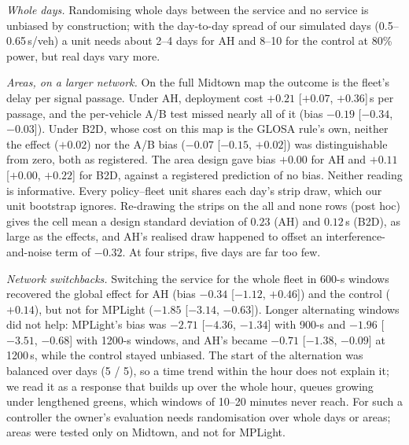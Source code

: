 \emph{Whole days.} Randomising whole days between the service and no service is unbiased by construction; with the day-to-day spread of our
simulated days (0.5--0.65\,s/veh) a unit needs about 2--4 days for AH and 8--10 for the control at 80\% power, but real days vary more.

\emph{Areas, on a larger network.} On the full Midtown map the outcome is the fleet's delay per signal passage. Under AH, deployment cost
$+0.21$ [$+0.07$, $+0.36$]\,s per passage, and the per-vehicle A/B test missed nearly all of it (bias $-0.19$ [$-0.34$, $-0.03$]).
Under B2D, whose cost on this map is the GLOSA rule's own, neither the effect ($+0.02$) nor the A/B bias ($-0.07$ [$-0.15$, $+0.02$]) was
distinguishable from zero, both as registered. The area design gave bias $+0.00$ for AH and $+0.11$ [$+0.00$, $+0.22$] for B2D, against
a registered prediction of no bias. Neither reading is informative. Every policy--fleet unit shares each day's strip draw, which our unit
bootstrap ignores. Re-drawing the strips on the all and none rows (post hoc) gives the cell mean a design standard deviation of $0.23$
(AH) and $0.12$\,s (B2D), as large as the effects, and AH's realised draw happened to offset an interference-and-noise term of $-0.32$.
At four strips, five days are far too few.

\emph{Network switchbacks.} Switching the service for the whole fleet in 600-s windows recovered the global effect for AH (bias $-0.34$
[$-1.12$, $+0.46$]) and the control ($+0.14$), but not for MPLight ($-1.85$ [$-3.14$, $-0.63$]). Longer alternating windows did not help: MPLight's bias was $-2.71$
[$-4.36$, $-1.34$] with 900-s and $-1.96$ [$-3.51$, $-0.68$] with 1200-s windows, and AH's became $-0.71$ [$-1.38$, $-0.09$] at 1200\,s,
while the control stayed unbiased. The start of the alternation was balanced over days (5 / 5), so a time trend within the hour does not
explain it; we read it as a response that builds up over the whole hour, queues growing under lengthened greens, which windows of 10--20
minutes never reach. For such a controller the owner's evaluation needs randomisation over whole days or areas; areas were tested only
on Midtown, and not for MPLight.

